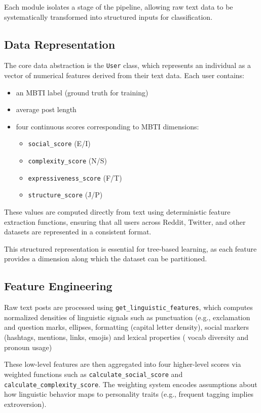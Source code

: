 \documentclass[11pt]{article}
\begin{document}
Each module isolates a stage of the pipeline, allowing raw text data to be systematically transformed into structured inputs for classification.

\subsection{Data Representation}

The core data abstraction is the \texttt{User} class, which represents an individual as a vector of numerical features derived from their text data. Each user contains:
\begin{itemize}
    \item an MBTI label (ground truth for training)
    \item average post length
    \item four continuous scores corresponding to MBTI dimensions:
    \begin{itemize}
        \item \texttt{social\_score} (E/I)
        \item \texttt{complexity\_score} (N/S)
        \item \texttt{expressiveness\_score} (F/T)
        \item \texttt{structure\_score} (J/P)
    \end{itemize}
\end{itemize}

These values are computed directly from text using deterministic feature extraction functions, ensuring that all users across Reddit, Twitter, and other datasets are represented in a consistent format.

This structured representation is essential for tree-based learning, as each feature provides a dimension along which the dataset can be partitioned.

\subsection{Feature Engineering}

Raw text posts are processed using \texttt{get\_linguistic\_features}, which computes normalized densities of linguistic signals such as punctuation (e.g., exclamation and question marks, ellipses, formatting (capital letter density), social markers (hashtags, mentions, links, emojis) and lexical properties ( vocab diversity and pronoun usage)

These low-level features are then aggregated into four higher-level scores via weighted functions such as \texttt{calculate\_social\_score} and \texttt{calculate\_complexity\_score}. The weighting system encodes assumptions about how linguistic behavior maps to personality traits (e.g., frequent tagging implies extroversion).
\end{document}
